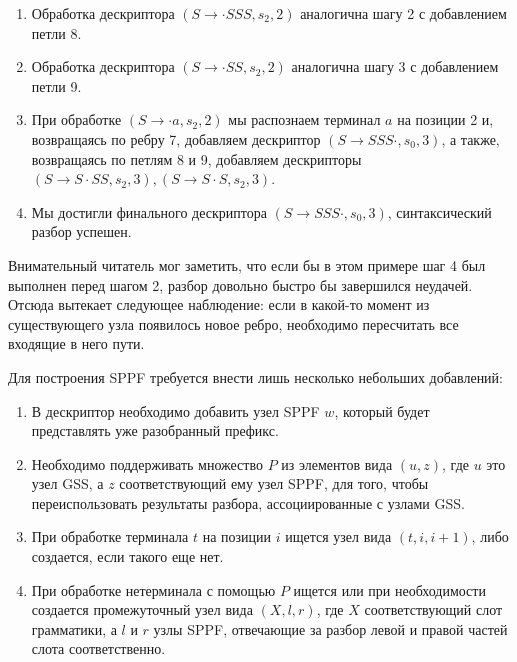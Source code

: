 \begin{example}
\begin{enumerate}
    \begin{center}
      
    \end{center}

    \item Обработка дескриптора $ (S \to \cdot S S S, s_2, 2) $ аналогична шагу 2 с добавлением петли 8.

    \begin{center}
      
    \end{center}

    \item Обработка дескриптора $ (S \to \cdot S S, s_2, 2) $ аналогична шагу 3 с добавлением петли 9.

    \begin{center}
      
    \end{center}

    \item При обработке $ (S \to \cdot a, s_2, 2) $ мы распознаем терминал $a$ на позиции 2 и, возвращаясь по ребру 7, добавляем дескриптор $ (S \to S S S \cdot, s_0, 3) $, а также, возвращаясь по петлям 8 и 9, добавляем дескрипторы $ (S \to S \cdot S S, s_2, 3), (S \to S \cdot S, s_2, 3) $.

    \item Мы достигли финального дескриптора $ (S \to S S S \cdot, s_0, 3) $, синтаксический разбор успешен.
  \end{enumerate}

\end{example}

Внимательный читатель мог заметить, что если бы в этом примере шаг 4 был выполнен перед шагом 2, разбор довольно быстро бы завершился неудачей. Отсюда вытекает следующее наблюдение: если в какой-то момент из существующего узла появилось новое ребро, необходимо пересчитать все входящие в него пути.

Для построения SPPF требуется внести лишь несколько небольших добавлений:

\begin{enumerate}
  \item В дескриптор необходимо добавить узел SPPF $ w $, который будет представлять уже разобранный префикс.
  \item Необходимо поддерживать множество $ P $ из элементов вида $ (u, z) $, где $ u $ это узел GSS, а $ z $ соответствующий ему узел SPPF, для того, чтобы переиспользовать результаты разбора, ассоциированные с узлами GSS.
  \item При обработке терминала $ t $ на позиции $ i $ ищется узел вида $ (t, i, i + 1) $, либо создается, если такого еще нет.
  \item При обработке нетерминала с помощью $ P $ ищется или при необходимости создается промежуточный узел вида $ (X, l, r) $, где $ X $ соответствующий слот грамматики, а $ l $ и $ r $ узлы SPPF, отвечающие за разбор левой и правой частей слота соответственно.
\end{enumerate}

